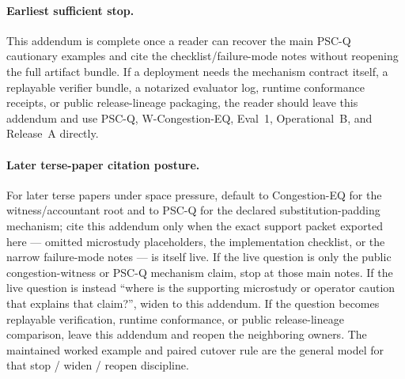 \documentclass[11pt]{article}
\theoremstyle{definition}
\theoremstyle{remark}
\begin{document}
\paragraph{Earliest sufficient stop.}
This addendum is complete once a reader can recover the main PSC-Q cautionary examples and cite the checklist/failure-mode notes without reopening the full artifact bundle.
If a deployment needs the mechanism contract itself, a replayable verifier bundle, a notarized evaluator log, runtime conformance receipts, or public release-lineage packaging, the reader should leave this addendum and use PSC-Q, W-Congestion-EQ, Eval~1, Operational~B, and Release~A directly.\cite{series:pscq,series:wcongeq,series:evalnotary,series:opb,series:releaseproperty}

\paragraph{Later terse-paper citation posture.}
For later terse papers under space pressure, default to Congestion-EQ for the witness/accountant root and to PSC-Q for the declared substitution-padding mechanism; cite this addendum only when the exact support packet exported here --- omitted microstudy placeholders, the implementation checklist, or the narrow failure-mode notes --- is itself live.
If the live question is only the public congestion-witness or PSC-Q mechanism claim, stop at those main notes.
If the live question is instead ``where is the supporting microstudy or operator caution that explains that claim?'', widen to this addendum.
If the question becomes replayable verification, runtime conformance, or public release-lineage comparison, leave this addendum and reopen the neighboring owners.
The maintained worked example and paired cutover rule are the general model for that stop / widen / reopen discipline.\cite{series:workedexample,series:pairedterminalcutoverrules}
\end{document}
